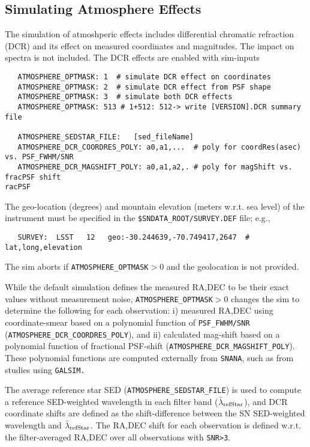 \documentclass[12pt]{article}
\newcommand{\snana}{{\tt SNANA}}
\begin{document}
\clearpage
\subsection{Simulating Atmosphere Effects}
\label{subsec:simAtmos}


The simulation of atmoshperic effects includes 
differential chromatic refraction (DCR)
and its effect on measured coordinates and magnitudes. The impact on spectra
is not included. The DCR effects are enabled with sim-inputs
 \begin{verbatim}
   ATMOSPHERE_OPTMASK: 1  # simulate DCR effect on coordinates
   ATMOSPHERE_OPTMASK: 2  # simulate DCR effect from PSF shape
   ATMOSPHERE_OPTMASK: 3  # simulate both DCR effects
   ATMOSPHERE_OPTMASK: 513 # 1+512: 512-> write [VERSION].DCR summary file

   ATMOSPHERE_SEDSTAR_FILE:   [sed_fileName]
   ATMOSPHERE_DCR_COORDRES_POLY: a0,a1,...  # poly for coordRes(asec) vs. PSF_FWHM/SNR
   ATMOSPHERE_DCR_MAGSHIFT_POLY: a0,a1,a2,. # poly for magShift vs. fracPSF shift
racPSF
\end{verbatim}
%
The geo-location (degrees) and mountain elevation (meters w.r.t. sea level) 
of the instrument must be specified 
in the {\tt \$SNDATA\_ROOT/SURVEY.DEF} file; e.g., 
\begin{verbatim}
   SURVEY:  LSST   12   geo:-30.244639,-70.749417,2647  # lat,long,elevation
\end{verbatim}
The sim aborts if {\tt ATMOSPHERE\_OPTMASK}$>0$ 
and the geolocation is not provided.


While the default simulation defines the measured RA,DEC to be their exact values
without measurement noise, {\tt ATMOSPHERE\_OPTMASK}$>0$ changes the sim
to determine the following for each observation:
i) measured RA,DEC using coordinate-smear based on a polynomial function of 
{\tt PSF\_FWHM/SNR} ({\tt ATMOSPHERE\_DCR\_COORDRES\_POLY}),  and 
ii) calculated mag-shift based on a polynomial function of fractional PSF-shift
({\tt ATMOSPHERE\_DCR\_MAGSHIFT\_POLY}).
These polynomial functions are computed externally from \snana,
such as from studies using {\tt GALSIM.}


\newcommand{\lamrefStar}{$\bar{\lambda}_{\rm refStar}$}
The average reference star SED ({\tt ATMOSPHERE\_SEDSTAR\_FILE}) is used to
compute a reference SED-weighted wavelength in each filter band (\lamrefStar), 
and DCR coordinate shifts are defined as the shift-difference between 
the SN SED-weighted wavelength and \lamrefStar.
The RA,DEC shift for each observation is defined w.r.t.
the filter-averaged RA,DEC over all observations with {\tt SNR>3}.
\end{document}
